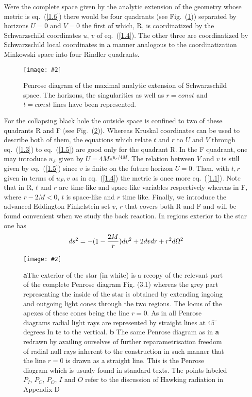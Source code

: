 \documentclass[12pt,oneside]{report}
\newcommand{\dessin}[4]
{\begin{figure}[tp]\begin{center}
\texttt{[image: \#2]}%
\end{center}
\caption{#4}
\label{#3}
\end{figure}}
\begin{document}
Were the complete space given by the analytic extension of the geometry 
whose metric is
eq.~(\ref {1.6})
there would be four quadrants (see Fig.~(\ref{krusk})) separated 
by horizons $U=0$ and
$V=0$ the first of which, R, is coordinatized by the Schwarzschild 
coordinates $u$,
$v$ of  eq.~(\ref {1.4}). The other three 
are coordinatized by Schwarzschild local
coordinates in a manner analogous to the coordinatization 
Minkowski space into four
Rindler quadrants. 
\dessin{1.000}{NFIG3-1.eps}{krusk}{Penrose diagram of the maximal analytic extension 
of Schwarzschild
space. The horizons, the singularities as well as $r=const$ and $t=const$ 
lines have been represented.}

For the collapsing black hole the outside space is confined to two of
these quadrants R  and
F (see Fig.~(\ref{collapse})). Whereas Kruskal coordinates can
be used to describe both of them, the equations  which relate $t$ and $r$ to $U$ and $V$ through
eq.~(\ref{1.3}) to eq.~(\ref{1.5}) are  good only for the quadrant R. In the F quadrant, one may
introduce $u_F$ given by
 $U = 4M e^{u_F/4M}
$. The relation between $V$ and $v$ is still given by eq.~(\ref{1.5}) since 
$v$ is finite on the future horizon $U=0$.
Then, with $t,r$ given in terms of $u_F,v$ as in 
eq.~(\ref {1.4}) 
the metric is once more eq.~(\ref{1.1}). Note that  in R,  $t$
and $ r$ are time-like and space-like variables respectively whereas in F,
where $r-2M<0$, 
 $t$ is space-like and $r$ time like.
Finally, we introduce the advanced  Eddington-Finkelstein set $v$, $r$ 
that covers both R and F
and will be found convenient when we study the back reaction.
 In regions exterior to the
star one has
\begin {eqnarray}
 ds^2 =-( 1 - {2M \over r}) dv^2 + 2dvdr +r^2 d\Omega^2\label {1.7} 
\end{eqnarray}
\dessin{0.8000}{NFIG3-2.eps}{collapse}{{\bf a}The exterior of the star (in white) is a 
recopy of the relevant part of the
complete Penrose diagram Fig. (3.1) whereas the grey  part 
representing the inside of the star is
obtained by extending ingoing and outgoing light cones through 
the two regions. The locus of the
apexes of these cones being the line $r=0$. As in all 
Penrose diagrams radial light rays are
represented by straight lines at $45^{\circ}$ degrees In te
to the vertical.\hfill
{\bf b} The same Penrose diagram as in {\bf a} redrawn by availing 
ourselves of further reparametrisation 
freedom of
radial null rays
 inherent to the construction in such manner that the line $r=0$ 
is drawn as a straight line. 
This is
the Penrose diagram which is usualy found in standard texts. The points
labeled $P_I$, $P_C$, $P_O$, $I$ and $O$ refer to the discussion of 
Hawking radiation in Appendix D}
\end{document}
